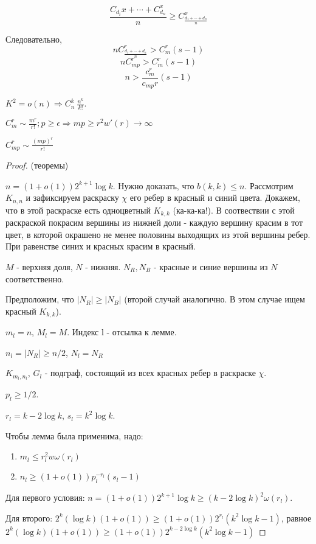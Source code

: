 \begin{proposition}
    $$\frac{C_{d_i}{x} + \cdots + C_{d_n}^x}{n} \ge C_{\frac{d_1+\cdots+d_n}{n}}^x$$
\end{proposition}

Следовательно, $$n C_{\frac{d_1+\cdots+d_n}{n}}^r > C_m^r(s-1)$$
$$n C_{mp}^r > C_m^r(s-1)$$
$$n > \frac{c_m^r}{c_{mp}{r}}(s-1)$$

$K^2 = o(n) \Rightarrow C_n^k ~ \frac{n^k}{k!}$.

$C_m^r \sim \frac{m^r}{r!}; p \ge \epsilon \Rightarrow mp \ge r^2w'(r) \rightarrow \infty$

$C_{mp}^{r} \sim \frac{(mp)^r}{r!}$


\begin{proof}
    (теоремы)

    $n = (1 + o(1))2^{k+1}\log k$. Нужно доказать, что $b(k,k) \le n$.
    Рассмотрим $K_{n,n}$ и зафиксируем раскраску $\chi$ его ребер в красный и синий цвета.
    Докажем, что в этой раскраске есть одноцветный $K_{k,k}$ (ка-ка-ка!).
    В соотвествии с этой раскраской покрасим вершины из нижней доли - каждую вершину красим в тот цвет, в которой окрашено не 
    менее половины выходящих из этой вершины ребер. При равенстве синих и красных красим в красный.

    $M$ - верхняя доля, $N$ - нижняя. $N_{R}, N_{B}$ - красные и синие вершины из $N$ соответственно.

    Предположим, что $|N_R| \ge |N_B|$ (второй случай аналогично. В этом случае ищем красный $K_{k,k}$).

    $m_{l} = n$, $M_{l} = M$. Индекс l - отсылка к лемме.

    $n_l = |N_R| \ge n/2$, $N_l = N_R$

    $K_{m_l, n_l}$, $G_l$ - подграф, состоящий из всех красных ребер в раскраске $\chi$.

    $p_l \ge 1/2$.

    $r_l = k - 2\log k$, $s_l = k^2 \log k$.

    Чтобы лемма была применима, надо:
    \begin{enumerate}
    \item $m_l \le r_l^2 w\omega(r_l)$
    \item $n_l \ge (1 + o(1)) p_l^{-r_l}(s_l - 1)$
    \end{enumerate}
    
    Для первого условия: $n = (1 + o(1))2^{k + 1} \log k \ge (k - 2 \log k)^2 \omega(r_l)$.

    Для второго: $2^k(\log k)(1 + o(1)) \ge (1 + o(1))2^{r_l}(k^2 \log k - 1)$,
    равное $2^k(\log k)(1 + o(1)) \ge (1 + o(1))2^{k - 2 \log k }(k^2 \log k - 1)$


\end{proof}
